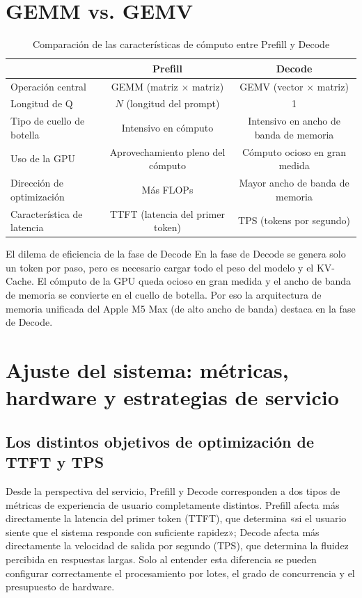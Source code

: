 \documentclass[a4paper]{article}
\begin{document}
\section{GEMM vs. GEMV}

\begin{table}[H]
\centering
\caption{Comparación de las características de cómputo entre Prefill y Decode}
\begin{tabular}{lcc}
\toprule
& \textbf{Prefill} & \textbf{Decode} \\
\midrule
Operación central & GEMM (matriz $\times$ matriz) & GEMV (vector $\times$ matriz) \\
Longitud de Q & $N$ (longitud del prompt) & 1 \\
Tipo de cuello de botella & Intensivo en cómputo & Intensivo en ancho de banda de memoria \\
Uso de la GPU & Aprovechamiento pleno del cómputo & Cómputo ocioso en gran medida \\
Dirección de optimización & Más FLOPs & Mayor ancho de banda de memoria \\
Característica de latencia & TTFT (latencia del primer token) & TPS (tokens por segundo) \\
\bottomrule
\end{tabular}
\end{table}

\begin{warningbox}{El dilema de eficiencia de la fase de Decode}
En la fase de Decode se genera solo un token por paso, pero es necesario cargar todo el peso del modelo y el KV-Cache. El cómputo de la GPU queda ocioso en gran medida y el ancho de banda de memoria se convierte en el cuello de botella. Por eso la arquitectura de memoria unificada del Apple M5 Max (de alto ancho de banda) destaca en la fase de Decode.
\end{warningbox}
\section{Ajuste del sistema: métricas, hardware y estrategias de servicio}

\subsection{Los distintos objetivos de optimización de TTFT y TPS}
Desde la perspectiva del servicio, Prefill y Decode corresponden a dos tipos de métricas de experiencia de usuario completamente distintos. Prefill afecta más directamente la latencia del primer token (TTFT), que determina «si el usuario siente que el sistema responde con suficiente rapidez»; Decode afecta más directamente la velocidad de salida por segundo (TPS), que determina la fluidez percibida en respuestas largas. Solo al entender esta diferencia se pueden configurar correctamente el procesamiento por lotes, el grado de concurrencia y el presupuesto de hardware.
\end{document}
